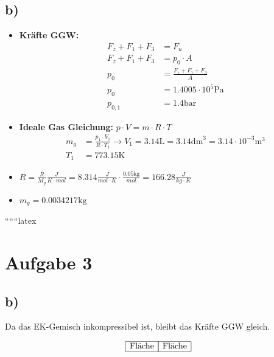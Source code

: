

\subsection*{b)}

\begin{itemize}
    \item \textbf{Kräfte GGW:}
    \begin{align*}
        F_z + F_1 + F_3 &= F_u \\
        F_z + F_1 + F_3 &= p_0 \cdot A \\
        p_0 &= \frac{F_z + F_1 + F_3}{A} \\
        p_0 &= 1.4005 \cdot 10^5 \text{Pa} \\
        p_{0,1} &= 1.4 \text{bar}
    \end{align*}
    \item \textbf{Ideale Gas Gleichung:} $p \cdot V = m \cdot R \cdot T$
    \begin{align*}
        m_g &= \frac{p_1 \cdot V_1}{R \cdot T_1} \rightarrow V_1 = 3.14 \text{L} = 3.14 \text{dm}^3 = 3.14 \cdot 10^{-3} \text{m}^3 \\
        T_1 &= 773.15 \text{K}
    \end{align*}
    \item $R = \frac{\bar{R}}{M_g} \frac{J}{K \cdot mol} = 8.314 \frac{J}{mol \cdot K} \cdot \frac{0.05 \text{kg}}{mol} = 166.28 \frac{J}{kg \cdot K}$
    \item $m_g = 0.0034217 \text{kg}$
\end{itemize}

``````latex


\section*{Aufgabe 3}



\subsection*{b)}

Da das EK-Gemisch inkompressibel ist, bleibt das Kräfte GGW gleich.

\[
\begin{array}{c}
\begin{array}{|c|}
\hline
\text{Fläche} \\
\hline
\end{array}
\begin{array}{|c|}
\hline
\text{Fläche} \\
\hline
\end{array}
\end{array}
\]

